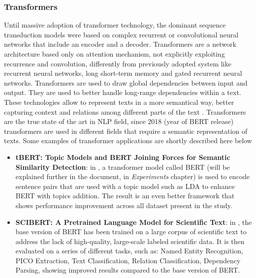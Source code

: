 \documentclass[\main/main.tex]{subfiles}
\begin{document}
\subsubsection{Transformers}
Until massive adoption of transformer technology, the dominant sequence transduction models were based on complex recurrent or convolutional neural networks that include an encoder and a decoder.
Transformers are a network architecture based only on attention mechanism, not explicitly exploiting recurrence and convolution, differently from previously adopted system like recurrent neural networks, long short-term memory and gated recurrent neural networks. Transformers are used to draw global dependencies between input and output. They are used to better handle long-range dependencies within a text. These technologies allow to represent texts in a more semantical way, better capturing context and relations among different parts of the text \cite{vaswani2017attention}. Transformers are the true state of the art in NLP field, since 2018 (year of BERT \cite{devlin2018bert}\cite{bert_blog_post} release) transformers are used in different fields that require a semantic representation of texts. Some examples of transformer applications are shortly described here below
\begin{itemize}
    \item \textbf{tBERT: Topic Models and BERT Joining Forces for Semantic Similarity Detection}: in \cite{Peinelt2020tBERTTM}, a transformer model called BERT (will be explained further in the document, in \emph{Experiments} chapter) is used to encode sentence pairs that are used with a topic model such as LDA to enhance BERT with topics addition. The result is an even better framework that shows performance improvement across all dataset present in the study.
    \item \textbf{SCIBERT: A Pretrained Language Model for Scientific Text}: in \cite{Beltagy2019SciBERTAP}, the base version of BERT has been trained on a large corpus of scientific text to address the lack of high-quality, large-scale labeled scientific data. It is then evaluated on a series of different tasks, such as: Named Entity Recognition, PICO Extraction, Text Classification, Relation Classification, Dependency Parsing, showing improved results compared to the base version of BERT.
\end{itemize}
\end{document}
